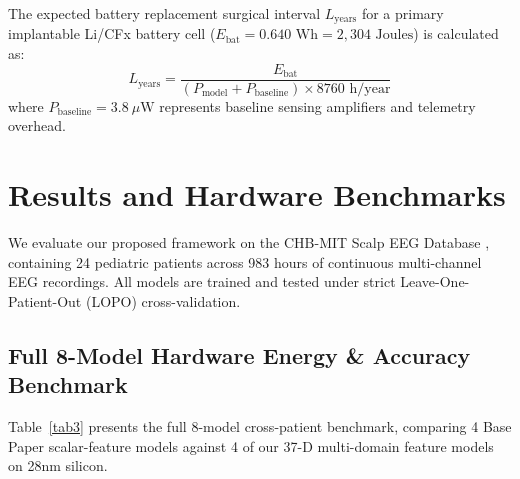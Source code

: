 \documentclass[pdflatex,sn-mathphys-num]{sn-jnl}%
\begin{document}
The expected battery replacement surgical interval $L_{\text{years}}$ for a primary implantable Li/CFx battery cell ($E_{\text{bat}} = 0.640\text{ Wh} = 2,304\text{ Joules}$) is calculated as:
\begin{equation}
L_{\text{years}} = \frac{E_{\text{bat}}}{(P_{\text{model}} + P_{\text{baseline}}) \times 8760\text{ h/year}}
\end{equation}
where $P_{\text{baseline}} = 3.8\ \mu\text{W}$ represents baseline sensing amplifiers and telemetry overhead.

\section{Results and Hardware Benchmarks}\label{sec4}

We evaluate our proposed framework on the CHB-MIT Scalp EEG Database \cite{guttag2010chb, goldberger2000physiobank, shoeb2009}, containing 24 pediatric patients across 983 hours of continuous multi-channel EEG recordings. All models are trained and tested under strict Leave-One-Patient-Out (LOPO) cross-validation.

\subsection{Full 8-Model Hardware Energy & Accuracy Benchmark}

Table~\ref{tab3} presents the full 8-model cross-patient benchmark, comparing 4 Base Paper scalar-feature models against 4 of our 37-D multi-domain feature models on 28nm silicon.
\end{document}
